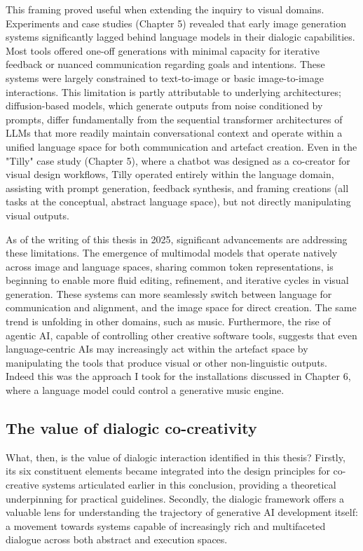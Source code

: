 This framing proved useful when extending the inquiry to visual domains. Experiments and case studies (Chapter 5) revealed that early image generation systems significantly lagged behind language models in their dialogic capabilities. Most tools offered one-off generations with minimal capacity for iterative feedback or nuanced communication regarding goals and intentions. These systems were largely constrained to text-to-image or basic image-to-image interactions. This limitation is partly attributable to underlying architectures; diffusion-based models, which generate outputs from noise conditioned by prompts, differ fundamentally from the sequential transformer architectures of LLMs that more readily maintain conversational context and operate within a unified language space for both communication and artefact creation. Even in the "Tilly" case study (Chapter 5), where a chatbot was designed as a co-creator for visual design workflows, Tilly operated entirely within the language domain, assisting with prompt generation, feedback synthesis, and framing creations (all tasks at the conceptual, abstract language space), but not directly manipulating visual outputs.

As of the writing of this thesis in 2025, significant advancements are addressing these limitations. The emergence of multimodal models that operate natively across image and language spaces, sharing common token representations, is beginning to enable more fluid editing, refinement, and iterative cycles in visual generation. These systems can more seamlessly switch between language for communication and alignment, and the image space for direct creation. The same trend is unfolding in other domains, such as music. Furthermore, the rise of agentic AI, capable of controlling other creative software tools, suggests that even language-centric AIs may increasingly act within the artefact space by manipulating the tools that produce visual or other non-linguistic outputs. Indeed this was the approach I took for the installations discussed in Chapter 6, where a language model could control a generative music engine. 

\subsection{The value of dialogic co-creativity}

What, then, is the value of dialogic interaction identified in this thesis? Firstly, its six constituent elements became integrated into the design principles for co-creative systems articulated earlier in this conclusion, providing a theoretical underpinning for practical guidelines. Secondly, the dialogic framework offers a valuable lens for understanding the trajectory of generative AI development itself: a movement towards systems capable of increasingly rich and multifaceted dialogue across both abstract and execution spaces.

